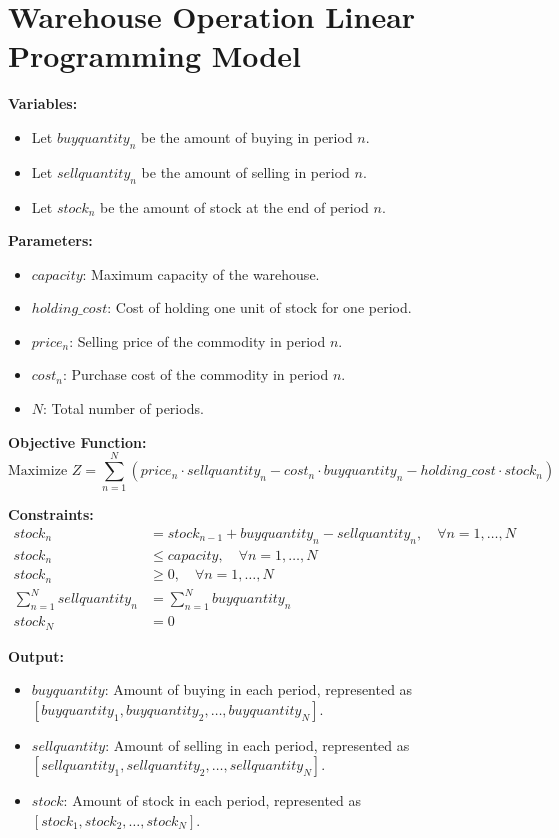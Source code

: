 \documentclass{article}
\begin{document}
\section*{Warehouse Operation Linear Programming Model}

\textbf{Variables:}
\begin{itemize}
    \item Let \( buyquantity_n \) be the amount of buying in period \( n \).
    \item Let \( sellquantity_n \) be the amount of selling in period \( n \).
    \item Let \( stock_n \) be the amount of stock at the end of period \( n \).
\end{itemize}

\textbf{Parameters:}
\begin{itemize}
    \item \( capacity \): Maximum capacity of the warehouse.
    \item \( holding\_cost \): Cost of holding one unit of stock for one period.
    \item \( price_n \): Selling price of the commodity in period \( n \).
    \item \( cost_n \): Purchase cost of the commodity in period \( n \).
    \item \( N \): Total number of periods.
\end{itemize}

\textbf{Objective Function:}
\[
\text{Maximize } Z = \sum_{n=1}^{N} (price_n \cdot sellquantity_n - cost_n \cdot buyquantity_n - holding\_cost \cdot stock_n)
\]

\textbf{Constraints:}
\begin{align*}
    stock_n & = stock_{n-1} + buyquantity_n - sellquantity_n, \quad \forall n = 1, \ldots, N \\
    stock_n & \leq capacity, \quad \forall n = 1, \ldots, N \\
    stock_n & \geq 0, \quad \forall n = 1, \ldots, N \\
    \sum_{n=1}^{N} sellquantity_n & = \sum_{n=1}^{N} buyquantity_n \\
    stock_N & = 0
\end{align*}

\textbf{Output:}
\begin{itemize}
    \item \( buyquantity \): Amount of buying in each period, represented as \( [buyquantity_1, buyquantity_2, \ldots, buyquantity_N] \).
    \item \( sellquantity \): Amount of selling in each period, represented as \( [sellquantity_1, sellquantity_2, \ldots, sellquantity_N] \).
    \item \( stock \): Amount of stock in each period, represented as \( [stock_1, stock_2, \ldots, stock_N] \).
\end{itemize}
\end{document}
